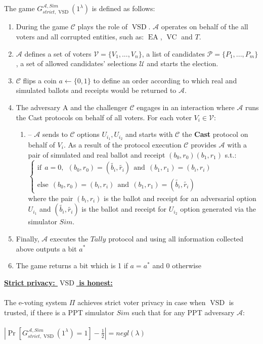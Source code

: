 \documentclass[12pt]{article}
\DeclareMathOperator{\vsd}{VSD}
\DeclareMathOperator{\ea}{EA}
\DeclareMathOperator{\bb}{BB}
\DeclareMathOperator{\voc}{VC}
\begin{document}
The game $G_{strict, \vsd}^{\mathcal{A},Sim}(1^{\lambda})$ is defined as follows:
\begin{enumerate}
\item During the game $\mathcal{C}$ plays the role of $\vsd$. 
 $\mathcal{A}$ operates on behalf of the all voters and all corrupted entities, such as: $\ea$, $\voc$ and $T$.
\item $\mathcal{A}$ defines a set of voters  $\mathcal{V} = \{V_1,...,V_n\}$, a list of candidates  $\mathcal{P} = \{P_1,...,P_m\}$, a set of allowed candidates' selections $\mathcal{U}$ and  starts the election.
\item $\mathcal{C}$ flips a coin $a \leftarrow \{0,1\}$ to define an order according to which real and simulated ballots and receipts would be returned to $\mathcal{A}$.
\item The adversary A and the challenger $\mathcal{C}$ engages in an interaction where $\mathcal{A}$ runs the Cast protocols on behalf of all voters. For each voter $V_i \in \mathcal{V}$:
\begin{enumerate}
\item[] --  $\mathcal{A}$ sends to  $\mathcal{C}$ options $U_{i_1}, U_{i_2}$ and starts with $\mathcal{C}$ the  \textbf{Cast}  protocol on behalf of $V_i$. As a result of the protocol execution $\mathcal{C}$  provides $\mathcal{A}$ with a pair of simulated and real ballot and receipt $(b_0, r_0) (b_1, r_1)$ s.t.:\\
$ \begin{cases}
 \text{if} ~~a =0,~~ (b_0,r_0) = (\tilde{b_i},\tilde{r_i}) ~~ \text{and} ~~  (b_1,r_1) = (b_i,r_i)   \\ 
 \text{else}~~ (b_0,r_0) =(b_i,r_i)~~  \text{and} ~~  (b_1,r_1) =(\tilde{b_i},\tilde{r_i})
\end{cases}$\\ 
where the pair $(b_i, r_i)$ is the ballot and receipt for an adversarial option $U_{i_1}$ and $(\tilde{b_i},\tilde{r_i})$ is the ballot and receipt for  $U_{i_2}$ option generated via the simulator $Sim$.
\end{enumerate}
\item Finally, $\mathcal{A}$  executes the $Tally$ protocol  and using all information collected above outputs a bit $a^*$
\item The game returns a bit which is 1 if $a = a^*$ and 0 otherwise
\end{enumerate}
\underline{\textbf{Strict privacy: $\vsd$ is honest:}}\\\\
The e-voting system $\Pi$ achieves strict voter privacy in case when $\vsd$ is trusted, if there is a PPT simulator $Sim$ such that for any PPT adversary $\mathcal{A}$:\\\\
 $|\Pr[G_{strict,\vsd}^{\mathcal{A},Sim}(1^{\lambda}) = 1] - \frac{1}{2}| = negl(\lambda)$\\\\
\end{document}
